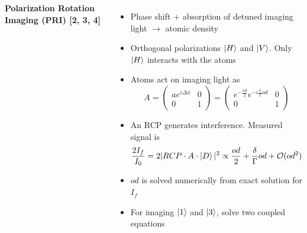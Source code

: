 \documentclass[26pt, paperwidth=36in,paperheight=48in]{tikzposter} %
\newcommand{\myfont}{\fontsize{26}{40}\selectfont}
\begin{document}
\begin{columns}
{} 








\block[roundedcorners=0]{\textcolor{BEC1blue}{Imaging Optically Dense Atomic Clouds}}
{
	\begin{minipage}{0.26\textwidth}
		\flushleft
		\vspace{0.5cm}
		\textbf{Polarization Rotation Imaging (PRI) [2, 3, 4]}
		\vspace{0.5cm}
		\myfont
		\begin{itemize}
		\item Phase shift + absorption of detuned imaging light $\rightarrow$ atomic density	
		\item Orthogonal polarizations $\ket{H}$ and $\ket{V}$. Only $\ket{H}$ interacts with the atoms
		\item Atoms act on imaging light as 
		$$ A = \left( \begin{array}{cc}  ae^{i\Delta \phi}  & 0 \\ 0 & 1 \end{array} \right)  = \left( \begin{array}{cc} 
			{e^{-\frac{od}{2}}}  
			{e^{-i \frac{\delta}{\Gamma}od}} 
			& 0 \\ 0 & 1 \end{array} \right) $$
			
		\item An RCP generates interference. Measured  signal is
			\begin{eqnarray*}
			\frac{2I_f}{I_0} = 2 | RCP \cdot A \cdot \ket{D}|^2 
			\propto \frac{od}{2} + \frac{\delta}{\Gamma} od + \mathcal{O}(od^2) 
			\end{eqnarray*}
			
		\item $od$ is solved numerically from exact solution for $I_f$ 
		\item For imaging $\ket{1}$ and $\ket{3}$, solve two coupled equations
		\end{itemize}
		

\end{minipage}}
\end{columns}
\end{document}
